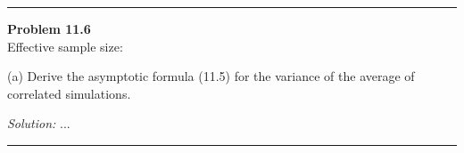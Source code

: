 \documentclass[a4paper, 11pt]{article}
\newenvironment{problem}[2][Problem]
    { \begin{mdframed}[backgroundcolor=gray!20] \textbf{#1 #2} \\}
    {  \end{mdframed}}
\newenvironment{solution}
    {\textit{Solution:}}
    {}
\begin{document}
\noindent\rule{7in}{2.8pt}
\begin{problem}{11.6}
  Effective sample size:

  (a) Derive the asymptotic formula (11.5) for the variance of the average of correlated simulations.
\end{problem}
\begin{solution}
...
\end{solution}

\noindent\rule{7in}{2.8pt}

\end{document}
